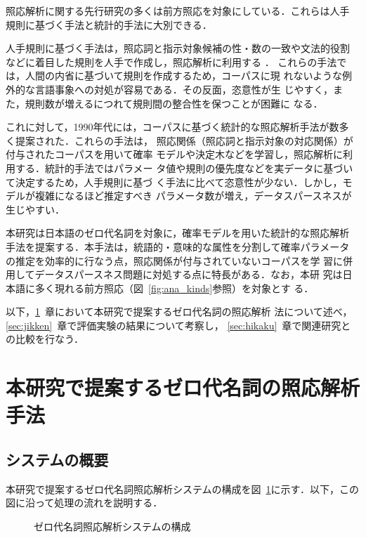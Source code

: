 照応解析に関する先行研究の多くは前方照応を対象にしている．これらは人手
規則に基づく手法と統計的手法に大別できる．

人手規則に基づく手法は，照応詞と指示対象候補の性・数の一致や文法的役割
などに着目した規則を人手で作成し，照応解析に利用する
\cite{bren87,hobbs78,kame86,mitk98,okum96,stru96,walk94,naka93,mura97}．
これらの手法では，人間の内省に基づいて規則を作成するため，コーパスに現
れないような例外的な言語事象への対処が容易である．その反面，恣意性が生
じやすく，また，規則数が増えるにつれて規則間の整合性を保つことが困難に
なる．

これに対して，1990年代には，コーパスに基づく統計的な照応解析手法が数多
く提案された\cite{aone95,ge98,soon99,ehar96,yama99}．これらの手法は，
照応関係（照応詞と指示対象の対応関係）が付与されたコーパスを用いて確率
モデルや決定木などを学習し，照応解析に利用する．統計的手法ではパラメー
タ値や規則の優先度などを実データに基づいて決定するため，人手規則に基づ
く手法に比べて恣意性が少ない．しかし，モデルが複雑になるほど推定すべき
パラメータ数が増え，データスパースネスが生じやすい．

本研究は日本語のゼロ代名詞を対象に，確率モデルを用いた統計的な照応解析
手法を提案する．本手法は，統語的・意味的な属性を分割して確率パラメータ
の推定を効率的に行なう点，照応関係が付与されていないコーパスを学
習に併用してデータスパースネス問題に対処する点に特長がある．なお，本研
究は日本語に多く現れる前方照応（図~\ref{fig:ana_kinds}参照）を対象とす
る．

以下，\ref{sec:houhou}~章において本研究で提案するゼロ代名詞の照応解析
法について述べ，\ref{sec:jikken}~章で評価実験の結果について考察し，
\ref{sec:hikaku}~章で関連研究との比較を行なう．


\section{本研究で提案するゼロ代名詞の照応解析手法}
\label{sec:houhou}

\subsection{システムの概要}
\label{sec:gaiyou}

本研究で提案するゼロ代名詞照応解析システムの構成を\mbox{図
  \ref{fig:system}}に示す．以下，この図に沿って処理の流れを説明する．

\begin{figure}[htbp]
  \begin{center}
    \caption{ゼロ代名詞照応解析システムの構成}
    \label{fig:system}
  \end{center}
\end{figure}

